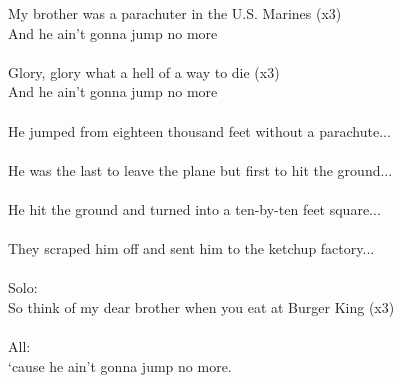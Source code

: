 
            My brother was a parachuter in the U.S. Marines (x3) \\
            And he ain’t gonna jump no more \\
\hspace{10mm} \\
            Glory, glory what a hell of a way to die (x3) \\
            And he ain’t gonna jump no more \\
\hspace{10mm} \\
            He jumped from eighteen thousand feet without a parachute... \\
\hspace{10mm} \\
            He was the last to leave the plane but first to hit the ground... \\
\hspace{10mm} \\
            He hit the ground and turned into a ten-by-ten feet square... \\
\hspace{10mm} \\
            They scraped him off and sent him to the ketchup factory... \\
\hspace{10mm} \\
            Solo: \\
            So think of my dear brother when you eat at Burger King (x3) \\
\hspace{10mm} \\
            All: \\
            ‘cause he ain’t gonna jump no more. \\
